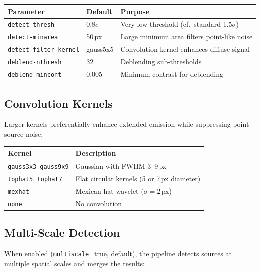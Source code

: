 \documentclass[11pt,fleqn]{book}
\begin{document}
\begin{center}
\begin{tabular}{lll}
\toprule
\textbf{Parameter} & \textbf{Default} & \textbf{Purpose} \\
\midrule
\texttt{detect-thresh} & 0.8$\sigma$ & Very low threshold (cf.\ standard 1.5$\sigma$) \\
\texttt{detect-minarea} & 50\,px & Large minimum area filters point-like noise \\
\texttt{detect-filter-kernel} & gauss5x5 & Convolution kernel enhances diffuse signal \\
\texttt{deblend-nthresh} & 32 & Deblending sub-thresholds \\
\texttt{deblend-mincont} & 0.005 & Minimum contrast for deblending \\
\bottomrule
\end{tabular}
\end{center}

\subsection{Convolution Kernels}

Larger kernels preferentially enhance extended emission while suppressing point-source noise:

\begin{center}
\begin{tabular}{ll}
\toprule
\textbf{Kernel} & \textbf{Description} \\
\midrule
\texttt{gauss3x3}--\texttt{gauss9x9} & Gaussian with FWHM 3--9\,px \\
\texttt{tophat5}, \texttt{tophat7} & Flat circular kernels (5 or 7\,px diameter) \\
\texttt{mexhat} & Mexican-hat wavelet ($\sigma=2$\,px) \\
\texttt{none} & No convolution \\
\bottomrule
\end{tabular}
\end{center}

\subsection{Multi-Scale Detection}

When enabled (\texttt{multiscale}=true, default), the pipeline detects sources at multiple spatial scales and merges the results:
\end{document}
